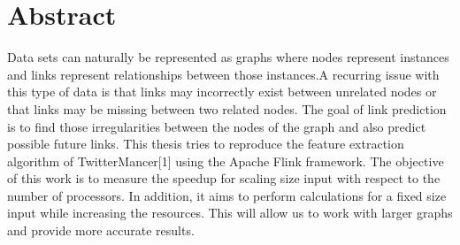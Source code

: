 \chapter*{\Large \center Abstract}

Data sets can naturally be represented as graphs where nodes represent instances and links represent relationships between those instances.A recurring issue with this type of data is that links may incorrectly exist between unrelated nodes or that links may be missing between two related nodes. The goal of link prediction is to find those irregularities between the nodes of the graph and also predict possible future links. \newline 
This thesis tries to reproduce the feature extraction algorithm of TwitterMancer[1] using the Apache Flink framework. The objective of this work is to measure the speedup for scaling size input with respect to the number of processors. In addition, it aims to perform calculations for a fixed size input while increasing the resources. This will allow us to work with larger graphs and provide more accurate results.
